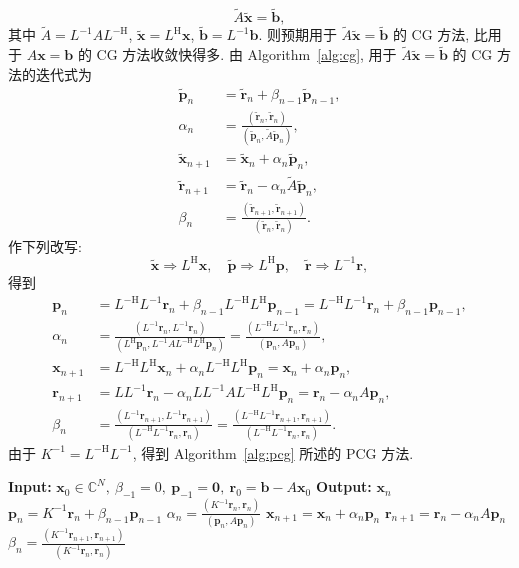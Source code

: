 \[\widetilde A\widetilde{\bm x}=\widetilde{\bm b},\]
{其中 $\widetilde A=L^{-1}AL^{-\mathrm H}$, $\widetilde{\bm x}=L^{\mathrm H}\bm x$, $\widetilde{\bm b}=L^{-1}\bm b$. 则预期用于 $\widetilde A\widetilde{\bm x}=\widetilde{\bm b}$ 的 CG 方法, 比用于 $A\bm x=\bm b$ 的 CG 方法收敛快得多. 由 Algorithm\ \ref{alg:cg}, 用于 $\widetilde A\widetilde{\bm x}=\widetilde{\bm b}$ 的 CG 方法的迭代式为}
\[\begin{aligned}
\widetilde{\bm p}_n&=\widetilde{\bm r}_n+\beta_{n-1}\widetilde{\bm p}_{n-1},\\
\alpha_n&=\frac{(\widetilde{\bm r}_n,\widetilde{\bm r}_n)}{(\widetilde{\bm p}_n,\widetilde A\widetilde{\bm p}_n)},\\
\widetilde{\bm x}_{n+1}&=\widetilde{\bm x}_n+\alpha_n\widetilde{\bm p}_n,\\
\widetilde{\bm r}_{n+1}&=\widetilde{\bm r}_n-\alpha_n\widetilde A\widetilde{\bm p}_n,\\
\beta_n&=\frac{(\widetilde{\bm r}_{n+1},\widetilde{\bm r}_{n+1})}{(\widetilde{\bm r}_n,\widetilde{\bm r}_n)}.
\end{aligned}\]
{作下列改写:}
\[\widetilde{\bm x}\Rightarrow L^{\mathrm H}\bm x,\quad\widetilde{\bm p}\Rightarrow L^{\mathrm H}\bm p,\quad\widetilde{\bm r}\Rightarrow L^{-1}\bm r,\]
{得到}
\[\begin{aligned}
\bm p_n&=L^{-\mathrm H}L^{-1}\bm r_n+\beta_{n-1}L^{-\mathrm H}L^{\mathrm H}\bm p_{n-1}=L^{-\mathrm H}L^{-1}\bm r_n+\beta_{n-1}\bm p_{n-1},\\
\alpha_n&=\frac{(L^{-1}\bm r_n,L^{-1}\bm r_n)}{(L^{\mathrm H}\bm p_n,L^{-1}AL^{-\mathrm H}L^{\mathrm H}\bm p_n)}=\frac{(L^{-\mathrm H}L^{-1}\bm r_n,\bm r_n)}{(\bm p_n,A\bm p_n)},\\
\bm x_{n+1}&=L^{-\mathrm H}L^{\mathrm H}\bm x_n+\alpha_nL^{-\mathrm H}L^{\mathrm H}\bm p_n=\bm x_n+\alpha_n\bm p_n,\\
\bm r_{n+1}&=LL^{-1}\bm r_n-\alpha_nLL^{-1}AL^{-\mathrm H}L^{\mathrm H}\bm p_n=\bm r_n-\alpha_nA\bm p_n,\\
\beta_n&=\frac{(L^{-1}\bm r_{n+1},L^{-1}\bm r_{n+1})}{(L^{-\mathrm H}L^{-1}\bm r_n,\bm r_n)}=\frac{(L^{-\mathrm H}L^{-1}\bm r_{n+1},\bm r_{n+1})}{(L^{-\mathrm H}L^{-1}\bm r_n,\bm r_n)}.
\end{aligned}\]
{由于 $K^{-1}=L^{-\mathrm H}L^{-1}$, 得到 Algorithm\ \ref{alg:pcg} 所述的 PCG 方法.}
\begin{algorithm}[H]\caption{{预条件 CG 方法}}\label{alg:pcg}
\begin{algorithmic}[1]
\Statex\textbf{Input:} $\bm x_0\in\mathbb C^N,\ \beta_{-1}=0,\ \bm p_{-1}=\bm0,\ \bm r_0=\bm b-A\bm x_0$
\Statex\textbf{Output:} $\bm x_n$
\State $\bm p_n=K^{-1}\bm r_n+\beta_{n-1}\bm p_{n-1}$
\State $\alpha_n=\frac{(K^{-1}\bm r_n,\bm r_n)}{(\bm p_n,A\bm p_n)}$
\State $\bm x_{n+1}=\bm x_n+\alpha_n\bm p_n$
\State $\bm r_{n+1}=\bm r_n-\alpha_nA\bm p_n$
\State $\beta_n=\frac{(K^{-1}\bm r_{n+1},\bm r_{n+1})}{(K^{-1}\bm r_n,\bm r_n)}$
\EndFor\end{algorithmic}\end{algorithm}
